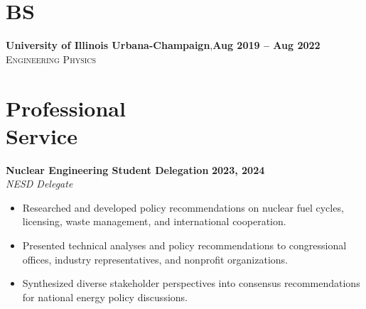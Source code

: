 \documentclass[margin,line]{resume}
\begin{document}
\begin{resume}
    \section{\mysidestyle BS}
    \textbf{University of Illinois Urbana-Champaign},\hfill\textbf{Aug 2019 -- Aug 2022}\\%
    \textsc{Engineering Physics}\\
    \vspace{-5mm}



    \section{\mysidestyle Professional\\Service}

    \textbf{Nuclear Engineering Student Delegation} \hfill \textbf{2023, 2024} \\
    \textsl{NESD Delegate} \\
    \begin{itemize}
        \item Researched and developed policy recommendations on nuclear fuel cycles, licensing, waste management, and international cooperation.
        \item Presented technical analyses and policy recommendations to congressional offices, industry representatives, and nonprofit organizations.
        \item Synthesized diverse stakeholder perspectives into consensus recommendations for national energy policy discussions.
    \end{itemize}


\end{resume}
\end{document}
